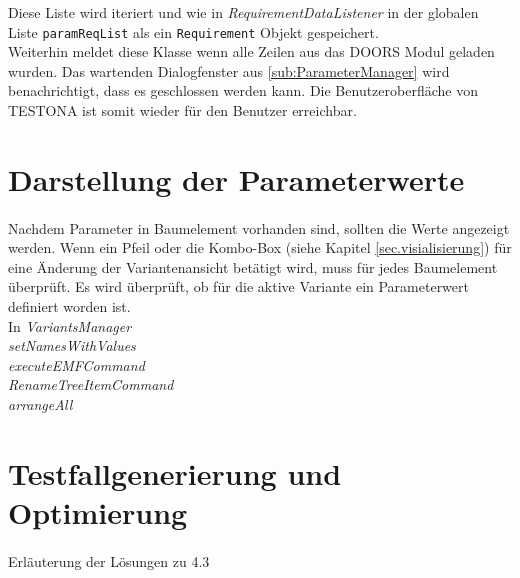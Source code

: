 Diese Liste wird iteriert und wie in \textit{RequirementDataListener} in der globalen Liste \texttt{paramReqList} als ein \texttt{Requirement} Objekt gespeichert.\\

Weiterhin meldet diese Klasse wenn alle Zeilen aus das DOORS Modul geladen wurden. Das wartenden Dialogfenster aus \ref{sub:ParameterManager} wird benachrichtigt, dass es geschlossen werden kann. Die Benutzeroberfläche von TESTONA ist somit wieder für den Benutzer erreichbar.



\newpage
\section{Darstellung der Parameterwerte}\label{sec.LoesungVisualisierung}
\paragraph{}

Nachdem Parameter in Baumelement vorhanden sind, sollten die Werte angezeigt werden. Wenn ein Pfeil oder die Kombo-Box (siehe Kapitel \ref{sec.visialisierung}) für eine Änderung der Variantenansicht betätigt wird, muss für jedes Baumelement überprüft. Es wird überprüft, ob für die aktive Variante ein Parameterwert definiert worden ist.\\

In \textit{VariantsManager}\\

 \textit{setNamesWithValues} \\
 \textit{executeEMFCommand} \\
 \textit{RenameTreeItemCommand}\\
 \textit{arrangeAll}\\
 
 


\newpage
\section{Testfallgenerierung und Optimierung}
\paragraph{}
Erläuterung der Lösungen zu 4.3